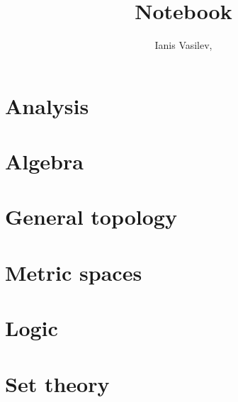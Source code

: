 \documentclass[bibliography=totocnumbered, oneside]{scrbook}
\title{Notebook}
\subtitle{\URL{https://github.com/v--/notebook}}
\author{Ianis Vasilev, \Email{ianis@ivasilev.net}}
\date{\justifying\small
  This ever-expanding document started as a set of study notes and exercises and gradually outgrew itself to become a slightly more encyclopedic set of study notes. Having all these notes in one place is quite helpful for both expressing my own thoughts clearly and for later reference. It is also helpful for tracking connections between seemingly unrelated concepts.

  Since these are study notes, they will naturally have a lot of errors, so read them with caution. Feel free to contact me if something in this document happens to distress you.

  I tried putting citations on everything. If there is no citation on a definition or theorem, that means that I have probably recalled it from memory. The simple proofs are mostly original and the difficult ones are, often loosely, based on proofs from the places cited. The omitted proofs are either too trivial or too involved for me to spend time on them.
}
\begin{document}
\hfuzz=3pt
\maketitle
\tableofcontents

\chapter{Analysis}\label{ch:analysis}











\chapter{Algebra}\label{ch:algebra}






\chapter{General topology}\label{ch:general_topology}








\chapter{Metric spaces}\label{ch:metric_spaces}





\chapter{Logic}\label{ch:logic}





\chapter{Set theory}\label{ch:set_theory}




\end{document}
